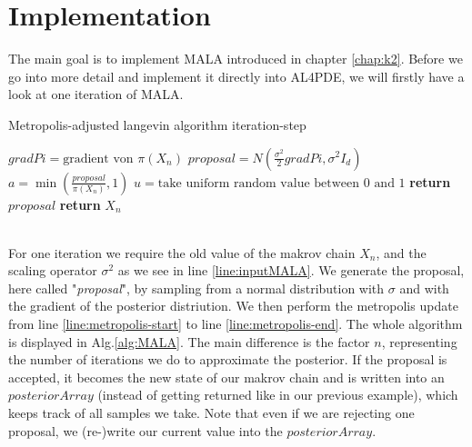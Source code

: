 \chapter{Implementation}\label{chap:implementation}
The main goal is to implement MALA introduced in chapter \ref{chap:k2}.
Before we go into more detail and implement it directly into AL4PDE, 
we will firstly have a look at one iteration of MALA.
\begin{algorithm}
    \caption{Metropolis-adjusted langevin algorithm iteration-step}
    \label{alg:MALA-step}
    \begin{algorithmic}[1] 
        \label{line:inputMALA}
            \State $gradPi = \text{gradient von $\pi(X_n)$}$
            \State $proposal = N(\frac{\sigma^2}{2} gradPi, \sigma^2I_d)$
            \State $a = \min(\frac{proposal}{\pi(X_n)},1)$\label{line:metropolis-start}
            \State $u = \text{take uniform random value between $0$ and $1$}$
                \State \textbf{return} $proposal$
            \EndIf
            \State \textbf{return} $X_n$\label{line:metropolis-end}
        \EndFunction
    \end{algorithmic}
\end{algorithm}
\\
For one iteration we require the old value of the makrov chain $X_n$, and 
the scaling operator $\sigma^2$ as we see in line \ref{line:inputMALA}. We generate the proposal,
here called "\textit{proposal}", by sampling from a normal distribution with 
$\sigma$ and with the gradient of the posterior distriution.
We then perform the metropolis update from line \ref{line:metropolis-start} to line \ref{line:metropolis-end}.
The whole algorithm is displayed in Alg.\ref{alg:MALA}. The main difference is the factor $n$, representing the number
of iterations we do to approximate the posterior. If the proposal is accepted, it becomes the new state 
of our makrov chain and is written into an $posteriorArray$ (instead of getting returned like in our previous example), which keeps track of all samples we take.
Note that even if we are rejecting one proposal, we (re-)write our current value into the $posteriorArray$.

